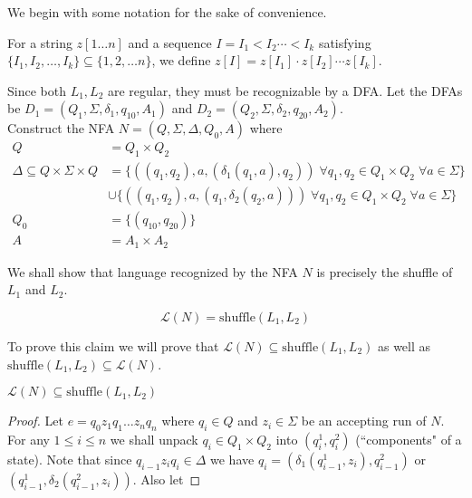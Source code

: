 \begin{soln}

We begin with some notation for the sake of convenience.

\begin{notn}
For a string $z[1 \ldots n]$ and a sequence $I = I_1 < I_2 \cdots < I_k$ satisfying $\{I_1, I_2, \ldots, I_k\} \subseteq \{1, 2, \ldots n\}$, we define $z[I] = z[I_1] \cdot z[I_2] \cdots z[I_k]$.
\end{notn}

Since both $L_1, L_2$ are regular, they must be recognizable by a DFA. Let the DFAs be $D_1 = (Q_1, \Sigma, \delta_1, q_{10}, A_1)$ and $D_2 = (Q_2, \Sigma, \delta_2, q_{20}, A_2)$.\\

Construct the NFA $N = (Q, \Sigma, \Delta, Q_0, A)$ where
\begin{align*}
    Q &= Q_1 \times Q_2 \\
    \Delta \subseteq Q \times \Sigma \times Q &=
        \{ ((q_1, q_2), a, (\delta_1(q_1, a), q_2)) \; \forall q_1, q_2 \in Q_1 \times Q_2 \; \forall a \in \Sigma \} \\
    &\cup \{ ((q_1, q_2), a, (q_1, \delta_2(q_2, a))) \; \forall q_1, q_2 \in Q_1 \times Q_2 \; \forall a \in \Sigma \} \\
    Q_0 &= \{ (q_{10}, q_{20} ) \} \\
    A &= A_1 \times A_2
\end{align*}

We shall show that language recognized by the NFA $N$ is precisely the \textrm{shuffle} of $L_1$ and $L_2$.\\

\begin{claim}
$$\mathcal{L}(N) = \mathrm{shuffle}(L_1, L_2)$$
\end{claim}

To prove this claim we will prove that $\mathcal{L}(N) \subseteq \mathrm{shuffle}(L_1, L_2)$ as well as $\mathrm{shuffle}(L_1, L_2) \subseteq \mathcal{L}(N)$.\\

\begin{claim}
$\mathcal{L}(N) \subseteq \mathrm{shuffle}(L_1, L_2)$
\end{claim}

\begin{proof}
Let $e = q_0 z_1 q_1 \ldots z_n q_n$ where $q_i \in Q$ and $z_i \in \Sigma$ be an accepting run of $N$. For any $1 \leq i \leq n$ we shall unpack $q_i \in Q_1 \times Q_2$ into $(q_i^1, q_i^2)$ (``components" of a state). Note that since $q_{i-1} z_i q_i \in \Delta$ we have $q_i = (\delta_1(q_{i-1}^1, z_i), q_{i-1}^2)$ or $(q_{i-1}^1, \delta_2(q_{i-1}^2, z_i))$. Also let


\end{proof}
\end{soln}
